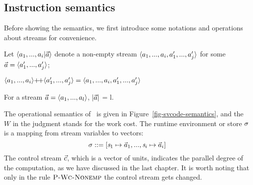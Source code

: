 \subsection{Instruction semantics}

Before showing the semantics, we first introduce some notations and operations about streams for convenience.
\begin{nota} 
	Let $\< a_1,...,a_i | \a \'>$ denote a non-empty stream $\< a_1,...,a_i, a_1',..., a_j' \'>$ for some $\a = \< a'_1,...,a'_j \'>$;
\end{nota}


\begin{nota}
	$\vapp{\vrange{a_1}{a_i}} {\vrange{a_1'}{a_j'}} = \langle a_1,...,a_i,a_1',...,a_j' \rangle $ \\
\end{nota}

\begin{nota}
	For a stream $\a = \< a_1,...,a_l \'>$, $|\vec a|$ = l. \\
\end{nota}

The operational semantics of \fmsvcode \  is given in Figure~\ref{fig-svcode-semantics}, and the $W$ in the judgment stands for the work cost.
The runtime environment or store $\sigma$ is a mapping from stream variables to vectors:
$$\sgm ::= [\s_1 \|-> {\a_1},...,\s_i \|-> {\a_i}]$$
The control stream $\vec c$, which is a vector of units, indicates the parallel degree of the computation, as we have discussed in the last chapter. 
It is worth noting that only in the rule $\textsc{P-Wc-Nonemp}$ the control stream gets changed.


